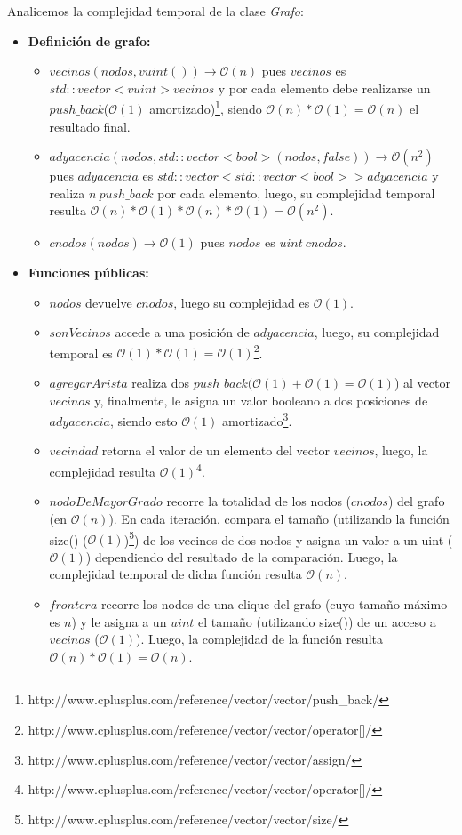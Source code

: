 \documentclass[10pt, a4paper]{article}
\begin{document}
\begin{itemize}
Analicemos la complejidad temporal de la clase \textit{Grafo}:
\begin{itemize}
\item \textbf{Definición de grafo:}
\begin{itemize}
\item $vecinos(nodos, vuint()) \rightarrow \mathcal{O}(n)$ pues $vecinos$ es $std::vector< vuint > vecinos$ y por cada elemento debe realizarse un $push\_back$($\mathcal{O}(1)$ amortizado)\footnote{http://www.cplusplus.com/reference/vector/vector/push\_back/}, siendo $\mathcal{O}(n)*\mathcal{O}(1) = \mathcal{O}(n)$ el resultado final.
\item $adyacencia(nodos, std::vector<bool>(nodos, false)) \rightarrow \mathcal{O}(n^2)$ pues $adyacencia$ es $std::vector<std::vector<bool> > adyacencia$ y realiza $n\ push\_back$ por cada elemento, luego, su complejidad temporal resulta $\mathcal{O}(n)*\mathcal{O}(1)*\mathcal{O}(n)*\mathcal{O}(1) = \mathcal{O}(n^2)$.
\item $cnodos(nodos) \rightarrow \mathcal{O}(1)$ pues $nodos$ es $uint\ cnodos$.
\end{itemize}
\item \textbf{Funciones públicas:}
\begin{itemize}
\item $nodos$ devuelve $cnodos$, luego su complejidad es $\mathcal{O}(1)$.
\item $sonVecinos$ accede a una posición de $adyacencia$, luego, su complejidad temporal es $\mathcal{O}(1)*\mathcal{O}(1) = \mathcal{O}(1)$\footnote{http://www.cplusplus.com/reference/vector/vector/operator[]/}.
\item $agregarArista$ realiza dos $push\_back (\mathcal{O}(1) + \mathcal{O}(1) = \mathcal{O}(1)$) al vector $vecinos$ y, finalmente, le asigna un valor booleano a dos posiciones de $adyacencia$, siendo esto $\mathcal{O}(1)$ amortizado\footnote{http://www.cplusplus.com/reference/vector/vector/assign/}.
\item $vecindad$ retorna el valor de un elemento del vector $vecinos$, luego, la complejidad resulta $\mathcal{O}(1)$\footnote{http://www.cplusplus.com/reference/vector/vector/operator[]/}.
\item $nodoDeMayorGrado$ recorre la totalidad de los nodos ($cnodos$) del grafo (en $\mathcal{O}(n)$). En cada iteración, compara el tamaño (utilizando la función size() ($\mathcal{O}(1)$)\footnote{http://www.cplusplus.com/reference/vector/vector/size/}) de los vecinos de dos nodos y asigna un valor a un uint ($\mathcal{O}(1)$) dependiendo del resultado de la comparación. Luego, la complejidad temporal de dicha función resulta $\mathcal{O}(n)$.
\item $frontera$ recorre los nodos de una clique del grafo (cuyo tamaño máximo es $n$) y le asigna a un $uint$ el tamaño (utilizando size()) de un acceso a $vecinos$ ($\mathcal{O}(1)$). Luego, la complejidad de la función resulta $\mathcal{O}(n)*\mathcal{O}(1) = \mathcal{O}(n)$.
\end{itemize}
\end{itemize}


\end{itemize}
\end{document}
